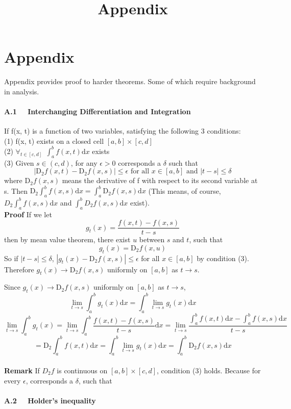 \section{Appendix}
\title{\textbf{{\LARGE Appendix\\}}}

Appendix provides proof to harder theorems. Some of which require background in analysis.\\


\paragraph{ A.1 \ \  Interchanging Differentiation and Integration}
If f(x, t) is a function of two variables, satisfying the following 3 conditions:\\
(1) f(x, t) exists on a closed cell $[a, b] \times [c, d]$\\
(2) $\forall_{t\in[c, d] }\ \ \int_a^b f(x, t) \mathrm{d}x$ exists\\
(3) Given $s \in (c, d)$, for any $\epsilon > 0$ corresponds a $\delta$ such that $$ | \mathrm{D}_2 f(x, t) - \mathrm{D}_2 f(x, s) | \leq \epsilon \text{ for all } x \in [a, b] \text{ and } | t - s | \leq \delta $$
where $\mathrm{D}_2 f(x, s)$ means the derivative of f with respect to its second variable at s.
Then $\mathrm{D}_2 \int_a^b f(x, s) \mathrm{d}x = \int_a^b \mathrm{D}_2 f(x, s) \mathrm{d}x$ (This means, of course, $D_2 \int_a^b f(x, s) \mathrm{d}x $ and $ \int_a^b D_2 f(x, s) \mathrm{d}x$ exist).\\

\textbf{Proof} If we let
$$g_t(x) = \frac{f(x, t)-f(x, s)}{t-s}$$
then by mean value theorem, there exist $u$ between $s$ and $t$, such that
$$g_t(x)= \mathrm{D}_2 f(x, u)$$
So if $|t-s|\leq\delta$, $ |g_t(x) - \mathrm{D}_2 f(x, s) | \leq \epsilon $ for all $x \in [a, b]$ by condition (3). Therefore $g_t(x)\to \mathrm{D}_2 f(x, s)$ uniformly on $[a, b]$ as $t\to s$.

Since $g_t(x)\to \mathrm{D}_2 f(x, s)$ uniformly on $[a, b]$ as $t\to s$,
$$\lim_{t\to s}\int_a^b g_t(x) \mathrm{d}x = \int_a^b \lim_{t\to s} g_t(x) \mathrm{d}x $$
$$\lim_{t\to s}\int_a^b g_t(x) = \lim_{t\to s}\int_a^b \frac{f(x, t)-f(x, s)}{t-s} \mathrm{d}x = \lim_{t\to s} \frac{\int_a^b f(x, t) \mathrm{d}x - \int_a^b f(x, s) \mathrm{d}x}{t-s}$$
$$ = \mathrm{D}_2 \int_a^b f(x, t) \mathrm{d}x
= \int_a^b \lim_{t\to s} g_t(x) \mathrm{d}x = \int_a^b \mathrm{D}_2 f(x, s) \mathrm{d}x $$\\

\textbf{Remark}
If $D_2 f$ is continuous on $[a, b]\times [c, d]$, condition (3) holds. Because for every $\epsilon$, corresponds a $\delta$, such that

\paragraph{ A.2 \ \  Holder's inequality\\}
